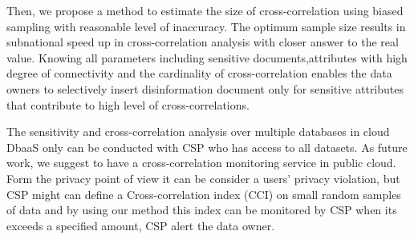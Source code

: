Then, we propose a method to estimate the size of cross-correlation using biased sampling with reasonable level of inaccuracy. The optimum sample size results in subnational speed up in cross-correlation analysis with closer answer to the real value. Knowing all parameters including sensitive documents,attributes with high degree of connectivity and the cardinality of cross-correlation enables the data owners to selectively insert disinformation document only for sensitive attributes that contribute to high level of cross-correlations.

The sensitivity and cross-correlation analysis over multiple databases in cloud DbaaS only can be conducted with CSP who has access to all datasets. As future work, we suggest to have a cross-correlation monitoring service in public cloud. Form the privacy point of view it can be consider a users' privacy violation, but CSP might can define a Cross-correlation index (CCI) on small random samples of data and by using our method this index can be monitored  by CSP when its exceeds a specified amount, CSP alert the data owner. 

